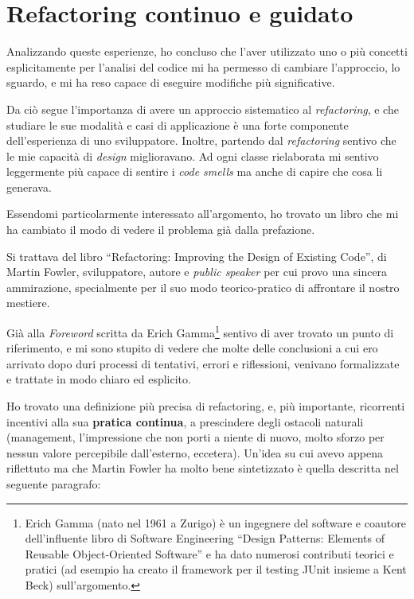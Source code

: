 \documentclass[12pt]{report}
\begin{document}
%
%
%
%
\chapter{Refactoring continuo e guidato}
\label{cap:refactoring_continuo}

Analizzando queste esperienze, ho concluso che l'aver utilizzato uno o più
concetti esplicitamente per l'analisi del codice mi ha permesso di
cambiare l'approccio, lo sguardo, e mi ha reso capace di eseguire
modifiche più significative.

Da ciò segue l'importanza di avere un approccio sistematico al 
\textit{refactoring}, e che studiare le sue modalità e casi di applicazione
è una forte componente dell'esperienza di uno sviluppatore. Inoltre, partendo
dal \textit{refactoring} sentivo che le mie capacità di \textit{design}
miglioravano. Ad ogni classe rielaborata mi sentivo leggermente più
capace di sentire i \textit{code smells} ma anche di capire 
che cosa li generava.

Essendomi particolarmente interessato all'argomento, ho trovato un libro 
che mi ha cambiato il modo di vedere il problema già dalla prefazione.

Si trattava del libro ``Refactoring: Improving the Design of
Existing Code''\cite{fowler2002}, di Martin Fowler, sviluppatore, 
autore e \textit{public speaker} per cui provo una sincera ammirazione,
specialmente per il suo modo teorico-pratico di affrontare il nostro
mestiere. 

Già alla \textit{Foreword} scritta da Erich Gamma\footnote{
Erich Gamma (nato nel 1961 a Zurigo) è un ingegnere del software e
coautore dell'influente libro di Software Engineering ``Design Patterns: 
Elements of Reusable Object-Oriented Software'' e ha dato numerosi contributi
teorici e pratici (ad esempio ha creato il framework per il testing 
JUnit insieme a Kent Beck) sull'argomento.
}
sentivo di aver trovato un punto di riferimento, e mi sono stupito di
vedere che molte delle conclusioni a cui ero arrivato dopo
duri processi di tentativi, errori e riflessioni, venivano formalizzate
e trattate in modo chiaro ed esplicito.

Ho trovato una definizione più precisa di refactoring, e, più importante, 
ricorrenti incentivi alla sua 
\textbf{pratica continua}, a prescindere degli ostacoli naturali (management, 
l'impressione che non porti a niente di nuovo, molto sforzo per nessun valore
percepibile dall'esterno, eccetera). Un'idea su cui avevo appena riflettuto
ma che Martin Fowler ha molto bene sintetizzato è quella descritta nel
seguente paragrafo:
\end{document}
